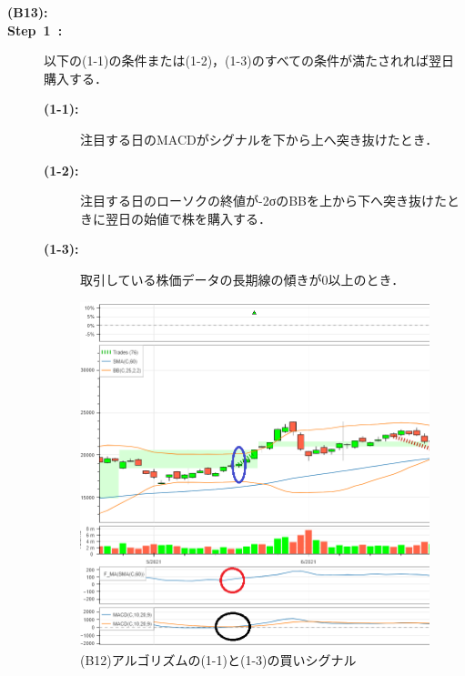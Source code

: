      \begin{description}
    \item[\textbf{(B13):}]
    \item[\textbf{Step~1~:}]以下の(1-1)の条件または(1-2)，(1-3)のすべての条件が満たされれば翌日購入する．
    \begin{description}
      \item[\textbf{(1-1):}]注目する日のMACDがシグナルを下から上へ突き抜けたとき．
      \item[\textbf{(1-2):}]注目する日のローソクの終値が-2σのBBを上から下へ突き抜けたときに翌日の始値で株を購入する．
      \item[\textbf{(1-3):}]取引している株価データの長期線の傾きが0以上のとき． 

     \end{description}  
     \begin{figure}[H]
      \centering
      \includegraphics[width=110mm]{fig/macdorbb0_and_fma_paint.png}
      \caption{(B12)アルゴリズムの(1-1)と(1-3)の買いシグナル}
      \label{fig:bb0ormacdfma}
     \end{figure}
  

\end{description}
